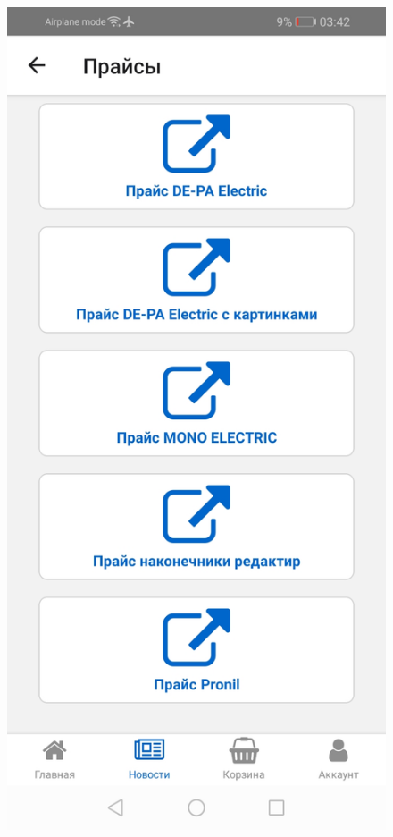 \begin{figure}[!p]
\begin{minipage}{0.19\textwidth}
        \includegraphics[width=.99\linewidth]
        {images/android/article-prices.jpg}
    \end{minipage}
    \begin{minipage}{0.19\textwidth}
        \centering


\end{minipage}
\end{figure}
